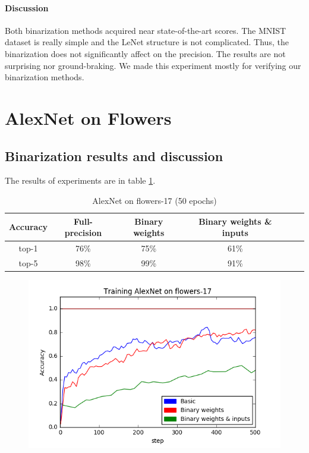 \documentclass[licencjacka]{pracamgr}
\begin{document}
		        \paragraph{Discussion} 
			Both binarization methods acquired near state-of-the-art scores. The MNIST dataset is really simple and the LeNet structure is not complicated. Thus, the binarization does not significantly affect on the precision. The results are not surprising nor ground-braking. We made this experiment mostly for verifying our binarization methods.
	\section{AlexNet on Flowers}
		\subsection{Binarization results and discussion}
		        The results of experiments are in table \ref{table:1}.
		        \begin{table}[H]
				\caption{AlexNet on flowers-17 (50 epochs)}
                    \centering
                    \begin{tabular}{c c c c c c}
                    \hline\hline
			    Accuracy & Full-precision & Binary weights & Binary weights \& inputs \\ [0.5ex]
                    \hline
			    top-1 & 76\% & 75\% & 61\% \\
                    \hline
			    top-5 & 98\% & 99\% & 91\% \\
                    \hline
                    \end{tabular}
                    \label{table:1}
	            \end{table}
	            \begin{figure}[h]
				\centering
				\includegraphics[width=\textwidth]{images/AlexNet-flowers17}
			\end{figure}
	            
\end{document}
